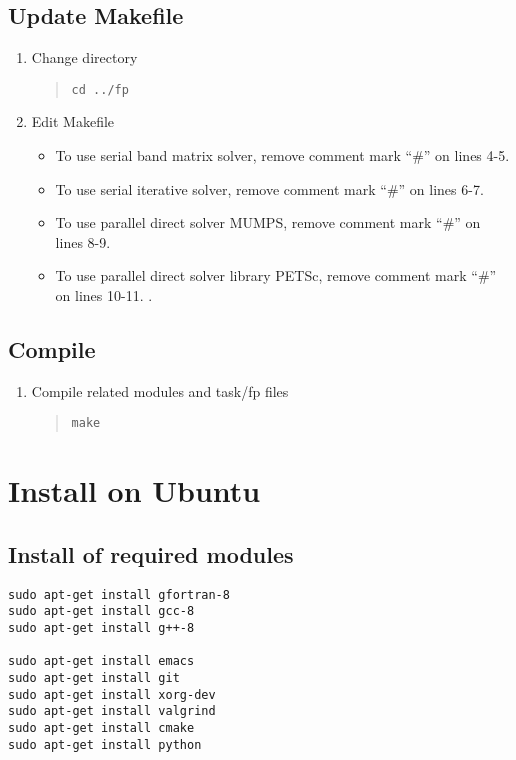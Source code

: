 \documentclass[11pt]{article}
\begin{document}
\subsection{Update Makefile}
\begin{enumerate}
\item
Change directory
\begin{quote}
\begin{verbatim}
cd ../fp
\end{verbatim}
\end{quote}
\item
Edit Makefile
\begin{itemize}
\item
To use serial band matrix solver, remove comment mark ``\#'' on lines 4-5.
\item
To use serial iterative solver, remove comment mark ``\#'' on lines 6-7.
\item
To use parallel direct solver MUMPS, remove comment mark ``\#'' on lines 8-9.
\item
To use parallel direct solver library PETSc, remove comment mark ``\#''
on lines 10-11. .
\end{itemize}
\end{enumerate}

\subsection{Compile}
\begin{enumerate}
\item
Compile related modules and task/fp files
\begin{quote}
\begin{verbatim}
make
\end{verbatim}
\end{quote}
\end{enumerate}

\section{Install on Ubuntu}

\subsection{Install of required modules}

\begin{verbatim}
sudo apt-get install gfortran-8
sudo apt-get install gcc-8
sudo apt-get install g++-8

sudo apt-get install emacs
sudo apt-get install git
sudo apt-get install xorg-dev
sudo apt-get install valgrind
sudo apt-get install cmake
sudo apt-get install python
\end{verbatim}
\end{document}
